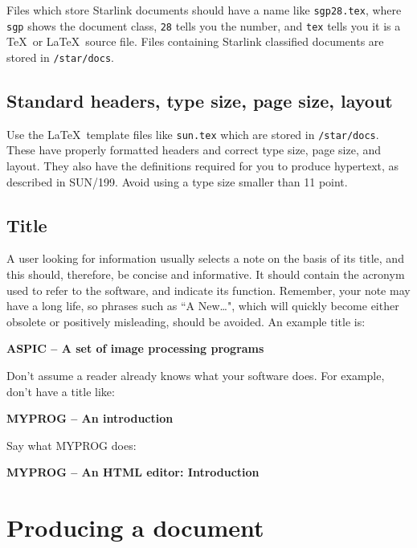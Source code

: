\documentclass[twoside,11pt]{article}
\newcommand{\xref}[3]{#1}
\begin{document}
Files which store Starlink documents should have a name like {\tt sgp28.tex},
where {\tt sgp} shows the document class, {\tt 28} tells you the number, and
{\tt tex} tells you it is a \TeX\ or \LaTeX\ source file.
Files containing Starlink classified documents are stored in {\tt /star/docs}.

\subsection{Standard headers, type size, page size, layout}

Use the \LaTeX\ template files like {\tt sun.tex} which are stored in
{\tt /star/docs}.
These have properly formatted headers and correct type size, page size, and
layout.
They also have the definitions required for you to produce hypertext, as
described in \xref{SUN/199}{sun199}{}.
Avoid using a type size smaller than 11 point.

\subsection{Title}

A user looking for information usually selects a note on the basis of its title,
and this should, therefore, be concise and informative.
It should contain the acronym used to refer to the software, and indicate its
function.
Remember, your note may have a long life, so phrases such as ``A New\ldots",
which will quickly become either obsolete or positively misleading, should be
avoided.
An example title is:

\begin{center}
{\bf ASPIC -- A set of image processing programs}
\end{center}

Don't assume a reader already knows what your software does.
For example, don't have a title like:

\begin{center}
{\bf MYPROG -- An introduction}
\end{center}

Say what MYPROG does:

\begin{center}
{\bf MYPROG -- An HTML editor: Introduction}
\end{center}

\newpage

\section{Producing a document}
\end{document}

